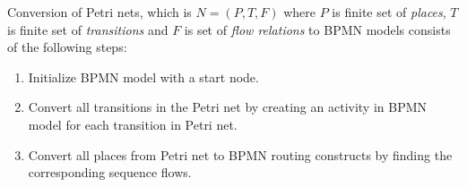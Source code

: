 \theoremstyle{definition}
\begin{definition}
Conversion of Petri nets, which is $N = (P, T, F)$ where $P$ is finite set of \textit{places}, $T$ is finite set of \textit{transitions} and $F$ is set of \textit{flow relations} to BPMN models consists of the following steps:
\begin{enumerate}
  \item Initialize BPMN model with a start node.
  \item Convert all transitions in the Petri net by creating an activity in BPMN model for each transition in Petri net.
  \item Convert all places from Petri net to BPMN routing constructs by finding the corresponding sequence flows.
\end{enumerate}
\end{definition}

